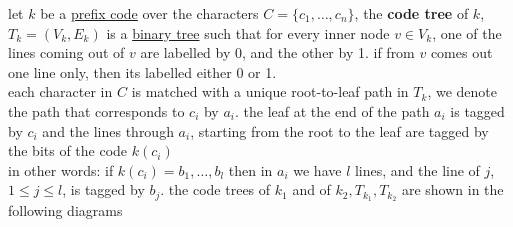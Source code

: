 \documentclass[a4paper,12pt]{article}
\newcommand{\?}{\stackrel{?}{=}}
\begin{document}
\newenvironment{note}
  {\begin{bclogo}[logo=\bcinfo, couleurBarre=orange, couleur=lightgray]{ note}}
  {\end{bclogo}}
\newenvironment{attention}
  {\begin{bclogo}[logo=\bcattention, couleurBarre=red, noborder=true, 
                couleur=red!15]{Important!}}
  {\end{bclogo}}

let \(k\) be a \href{20230119174917-prefix_code.org}{prefix code} over the characters \(C=\{c_1,\dots,c_n\}\), the \textbf{code tree} of \(k\), \(T_k=(V_k,E_k)\) is a \href{data_structures.org}{binary tree} such that for every inner node \(v \in V_k\), one of the lines coming out of \(v\) are labelled by 0, and the other by 1. if from \(v\) comes out one line only, then its labelled either 0 or 1.\\[0pt]
each character in \(C\) is matched with a unique root-to-leaf path in \(T_k\), we denote the path that corresponds to \(c_i\) by \(a_i\). the leaf at the end of the path \(a_i\) is tagged by \(c_i\) and the lines through \(a_i\), starting from the root to the leaf are tagged by the bits of the code \(k(c_i)\)\\[0pt]
in other words: if \(k(c_i)=b_1,\dots,b_l\) then in \(a_i\) we have \(l\) lines, and the line of \(j\), \(1 \le j \le l\), is tagged by \(b_j\). the code trees of \(k_1\) and of \(k_2,T_{k_1},T_{k_2}\) are shown in the following diagrams\\[0pt]
\end{document}
